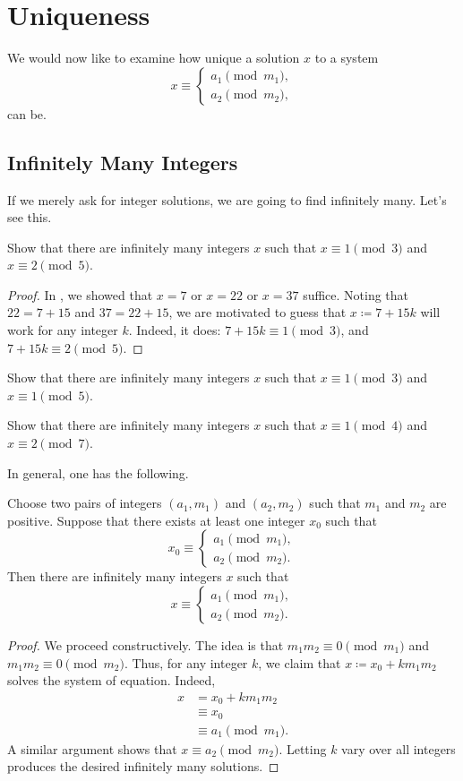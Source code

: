 \documentclass{article}
\begin{document}
\section{Uniqueness} \label{sec:uniqueness}
We would now like to examine how unique a solution $x$ to a system
\[x\equiv\begin{cases}
	a_1\pmod{m_1}, \\
	a_2\pmod{m_2},
\end{cases}\]
can be.

\subsection{Infinitely Many Integers}
If we merely ask for integer solutions, we are going to find infinitely many. Let's see this.
\begin{example}
	Show that there are infinitely many integers $x$ such that $x\equiv1\pmod3$ and $x\equiv2\pmod5$.
\end{example}
\begin{proof}
	In , we showed that $x=7$ or $x=22$ or $x=37$ suffice. Noting that $22=7+15$ and $37=22+15$, we are motivated to guess that $x\coloneqq7+15k$ will work for any integer $k$. Indeed, it does: $7+15k\equiv1\pmod3$, and $7+15k\equiv2\pmod5$.
\end{proof}
\begin{exe}
	Show that there are infinitely many integers $x$ such that $x\equiv1\pmod3$ and $x\equiv1\pmod5$.
\end{exe}
\begin{exe}
	Show that there are infinitely many integers $x$ such that $x\equiv1\pmod4$ and $x\equiv2\pmod7$.
\end{exe}
In general, one has the following.
\begin{proposition}
	Choose two pairs of integers $(a_1,m_1)$ and $(a_2,m_2)$ such that $m_1$ and $m_2$ are positive. Suppose that there exists at least one integer $x_0$ such that
	\[x_0\equiv\begin{cases}
		a_1 \pmod{m_1}, \\
		a_2 \pmod{m_2}.
	\end{cases}\]
	Then there are infinitely many integers $x$ such that
	\[x\equiv\begin{cases}
		a_1 \pmod{m_1}, \\
		a_2 \pmod{m_2}.
	\end{cases}\]
\end{proposition}
\begin{proof}
	We proceed constructively. The idea is that $m_1m_2\equiv0\pmod{m_1}$ and $m_1m_2\equiv0\pmod{m_2}$. Thus, for any integer $k$, we claim that $x\coloneqq x_0+km_1m_2$ solves the system of equation. Indeed,
	\begin{align*}
		x &= x_0+km_1m_2 \\
		&\equiv x_0 \\
		&\equiv a_1\pmod{m_1}.
	\end{align*}
	A similar argument shows that $x\equiv a_2\pmod{m_2}$. Letting $k$ vary over all integers produces the desired infinitely many solutions.
\end{proof}
\end{document}
